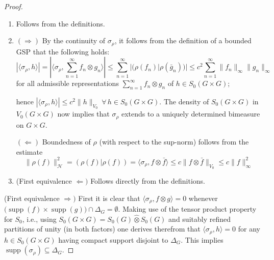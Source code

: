 \documentclass[graybox]{svmult}
\begin{document}
\begin{proof}\
\begin{enumerate}
\item[(a)] Follows from the definitions.

\item[(b)] $(\Rightarrow )$ By the continuity of ${\sigma_{ \rho}}$, it
follows from the definition  of  a bounded GSP that
the following holds:
\[
| \langle{\sigma_{ \rho}}, h \rangle| = 
| \langle{\sigma_{ \rho}},\sum^{\infty }_{n=1}f_{n}\otimes
g_{n}\rangle| \le \sum^{\infty }_{n=1}| (\rho (f_{n})| \rho
(\bar{g}_{n}))| \le c^{2} \sum^{\infty }_{n=1}\| f_{n}\| _{\infty }\|
g_{n}\| _{\infty }
\]
for all admissible representations
$\sum^{\infty}_{n=1}f_{n}\otimes g_{n}$
of $h\in {}S_{0}(G\times G)$;

\noindent hence
$| \langle{\sigma_{ \rho}},h\rangle|  \le
 c^{2}\|h\| _{V_{0}}  \ \forall \,  h \in S_{0}(G\times G)$.
%
The density of $S_{0}(G \times G)$ 
in $V_{0}(G \times G)$ now implies that
${\sigma_{ \rho}}$ extends to a uniquely determined
bimeasure on $G \times G$.

$(\Leftarrow )$ Boundedness of $\rho $ (with respect
   to the sup-norm) follows from the estimate
\[
\| \rho (f)\| ^{2}_{\mathcal{H}} = (\rho (f)| \rho (f)) = \langle\sigma
_{\rho},f\otimes \bar{f}\rangle \le c\| f\otimes \bar{f}\| _{V_{0}} \le
c\| f\| ^{2}_{\infty }
\]

\item[(c)] (First equivalence $\Leftarrow )$ Follows directly from the definitions.
\end{enumerate}
(First equivalence $\Rightarrow )$ %
First it is clear
that $\langle{\sigma_{ \rho}},f\otimes g\rangle = 0$ whenever
$\bigl(\operatorname{supp}(f)\times \operatorname{supp}(g) \bigr) \cap \varDelta _{G}  =
 \emptyset$.
Making use of the tensor product property for $S_0$, i.e., using $S_{0}(G\times G) = {S_{0}(G)}\hat{\otimes }{S_{0}(G)}$
and suitably refined partitions of unity (in both factors)
one derives therefrom that
$\langle{\sigma_{ \rho}},h\rangle = 0$ for any
$h \in S_{0}(G\times G)$ having compact support disjoint to
$\varDelta _{G}$.
This implies $\operatorname{supp}(\sigma _{\rho}) \subseteq \varDelta _{G}$.


\end{proof}
\end{document}
